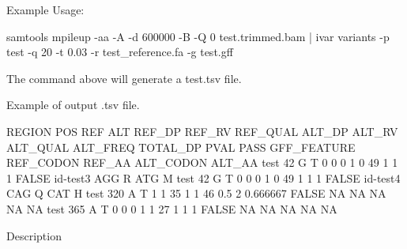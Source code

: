 Example Usage\+:


\begin{DoxyCode}
samtools mpileup -aa -A -d 600000 -B -Q 0 test.trimmed.bam | ivar variants -p test -q 20 -t 0.03 -r
       test\_reference.fa -g test.gff
\end{DoxyCode}


The command above will generate a test.\+tsv file.

Example of output .tsv file.


\begin{DoxyCode}
REGION  POS REF ALT REF\_DP  REF\_RV  REF\_QUAL    ALT\_DP  ALT\_RV  ALT\_QUAL    ALT\_FREQ    TOTAL\_DP    PVAL   
       PASS    GFF\_FEATURE REF\_CODON   REF\_AA  ALT\_CODON   ALT\_AA
test    42  G   T   0   0   0   1   0   49  1   1   1   FALSE   id-test3    AGG R   ATG M
test    42  G   T   0   0   0   1   0   49  1   1   1   FALSE   id-test4    CAG Q   CAT H
test    320 A   T   1   1   35  1   1   46  0.5 2   0.666667    FALSE   NA  NA  NA  NA  NA
test    365 A   T   0   0   0   1   1   27  1   1   1   FALSE   NA  NA  NA  NA  NA
\end{DoxyCode}


Description

